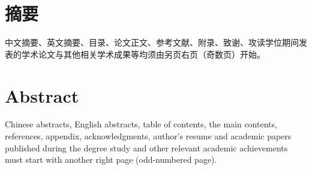 
\maketitle%
\MAKETITLE%
\makedeclaration%
\intobmk\chapter*{摘\quad 要}%
\setcounter{page}{1}%

中文摘要、英文摘要、目录、论文正文、参考文献、附录、致谢、攻读学位期间发表的学术论文与其他相关学术成果等均须由另页右页（奇数页）开始。

\cleardoublepage
\pagestyle{enfrontmatterstyle}%

\intobmk\chapter*{Abstract}%

Chinese abstracts, English abstracts, table of contents, the main contents, references, appendix, acknowledgments, author's resume and academic papers published during the degree study and other relevant academic achievements must start with another right page (odd-numbered page).


\cleardoublepage\pagestyle{frontmatterstyle}%

